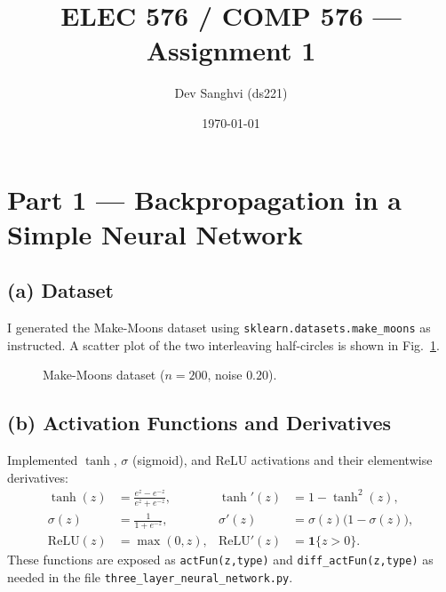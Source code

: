 \documentclass[11pt]{article}
\title{ELEC 576 / COMP 576 --- Assignment 1\\\large }
\author{Dev Sanghvi (ds221)}
\date{\today}
\begin{document}
\maketitle

\newpage

\section{Part 1 --- Backpropagation in a Simple Neural Network}
\subsection{(a) Dataset}
I generated the Make-Moons dataset using \texttt{sklearn.datasets.make\_moons} as instructed. A scatter plot of the two interleaving half-circles is shown in Fig.~\ref{fig:moons-scatter}.

\begin{figure}[H]
  \centering
  \caption{Make-Moons dataset ($n{=}200$, noise $0.20$).}
  \label{fig:moons-scatter}
\end{figure}


\subsection{(b) Activation Functions and Derivatives}
Implemented \(\tanh\), \(\sigma\) (sigmoid), and ReLU activations and their elementwise derivatives:\vspace{.2em}
\begin{align*}
  \tanh(z) &= \frac{e^{z} - e^{-z}}{e^{z} + e^{-z}}, & \tanh'(z) &= 1 - \tanh^2(z),\\
  \sigma(z) &= \frac{1}{1+e^{-z}}, & \sigma'(z) &= \sigma(z)\bigl(1-\sigma(z)\bigr),\\
  \mathrm{ReLU}(z) &= \max(0,z), & \mathrm{ReLU}'(z) &= \mathbf{1}\{z>0\}.
\end{align*}
These functions are exposed as \verb|actFun(z,type)| and \verb|diff_actFun(z,type)| as needed in the file \newline \texttt{three\_layer\_neural\_network.py}.
\end{document}
